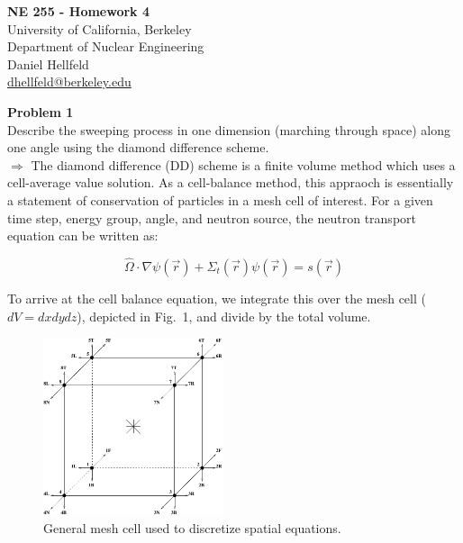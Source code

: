 \documentclass[10pt]{article}
\begin{document}
\begin{centering}
\textbf{\large NE 255 - Homework 4}\\
\vspace{10pt}
University of California, Berkeley\\
Department of Nuclear Engineering\\
\vspace{10pt}
Daniel Hellfeld\\
\href{mailto:dhellfeld@berkeley.edu}{dhellfeld@berkeley.edu}\\
\end{centering}






\vspace{20pt}
\noindent \textbf{Problem 1}\\
Describe the sweeping process in one dimension (marching through space) along one angle using the diamond difference scheme.\\

$\Rightarrow$ The diamond difference (DD) scheme is a finite volume method which uses a cell-average value solution. As a cell-balance method, this appraoch is essentially a statement of conservation of particles in a mesh cell of interest. For a given time step, energy group, angle, and neutron source, the neutron transport equation can be written as:

\begin{equation*}
        \hat{\Omega} \cdot \nabla \psi(\vec{r}) + \Sigma_t(\vec{r})\psi(\vec{r}) = s(\vec{r})
\end{equation*}

To arrive at the cell balance equation, we integrate this over the mesh cell ($dV = dxdydz$), depicted in Fig.~1, and divide by the total volume.

\begin{figure}[htb]
    \centering
    \includegraphics[width=150pt]{Figures/mesh_cell_sn}
    \caption{General mesh cell used to discretize spatial equations.}
    \label{cellmesh}
\end{figure}
\end{document}

